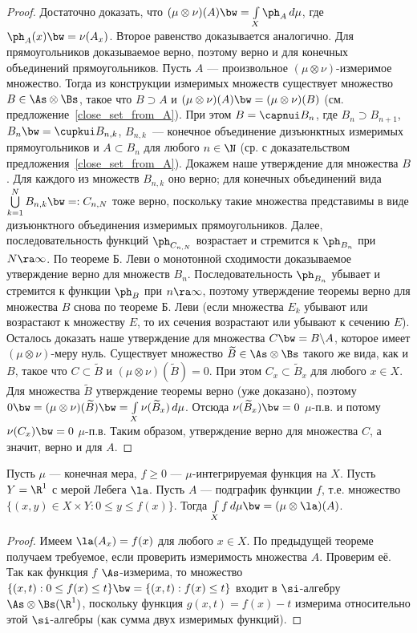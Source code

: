 \documentclass[10pt]{article}
\begin{document}
\begin{proof}
Достаточно доказать, что $(\mu\otimes\nu)(A)\bw
=\int\limits_X\ph_A\,d\mu$, где $\ph_A(x)\bw =\nu(A_x)$. Второе
равенство доказывается аналогично. Для прямоугольников доказываемое
верно, поэтому верно и для конечных объединений прямоугольников.
Пусть $A$ --- произвольное $(\mu\otimes\nu)$-измеримое множество.
Тогда из конструкции измеримых множеств существует множество
$B\in\As\otimes\Bs$, такое что $B\supset A$ и $(\mu\otimes\nu)(A)\bw
=(\mu\otimes\nu)(B)$ (см. предложение~\ref{close_set_from_A}). При
этом $B=\capnui B_n$, где $B_n\supset B_{n+1}$, $B_n\bw =\cupkui
B_{n,k}$, $B_{n,k}$~--- конечное объединение дизъюнктных измеримых
прямоугольников и $A\subset B_n$ для любого $n\in\N$ (ср. с
доказательством предложения~\ref{close_set_from_A}). Докажем наше
утверждение для множества $B$. Для каждого из множеств $B_{n,k}$ оно
верно; для конечных объединений вида
$\bigcup\limits_{k=1}^NB_{n,k}\bw =:C_{n,N}$ тоже верно, поскольку
такие множества представимы в виде дизъюнктного объединения
измеримых прямоугольников. Далее, последовательность функций
$\ph_{C_{n,N}}$ возрастает и стремится к $\ph_{B_n}$ при
$N\ra\infty$. По теореме Б. Леви о монотонной сходимости
доказываемое утверждение верно для множеств $B_n$.
Последовательность $\ph_{B_n}$ убывает и стремится к функции $\ph_B$
при $n\ra\infty$, поэтому утверждение теоремы верно для множества
$B$ снова по теореме Б. Леви (если множества $E_k$ убывают или
возрастают к множеству $E$, то их сечения возрастают или убывают к
сечению $E$). Осталось доказать наше утверждение для множества $C\bw
= B\backslash A$, которое имеет $(\mu\otimes\nu)$-меру нуль.
Существует множество $\widetilde B\in \As\otimes\Bs$ такого же вида,
как и $B$, такое что $C\subset \widetilde B$ и
$(\mu\otimes\nu)(\widetilde B)=0$. При этом $C_x\subset \widetilde
B_x$ для любого $x\in X$. Для множества $\widetilde B$ утверждение
теоремы верно (уже доказано), поэтому $0\bw
=(\mu\otimes\nu)(\widetilde B)\bw =\int\limits_X\nu(\widetilde
B_x)\,d\mu$. Отсюда $\nu(\widetilde B_x)\bw =0$ $\mu$-п.в. и потому
$\nu(C_x)\bw =0$ $\mu$-п.в. Таким образом, утверждение верно для
множества $C$, а значит, верно и для $A$.
\end{proof}
\begin{imp}\label{subgraphic}
Пусть $\mu$ --- конечная мера, $f\ge 0$ --- $\mu$-интегрируемая
функция на $X$. Пусть $Y=\R^1$ с мерой Лебега $\la$. Пусть $A$ ---
подграфик функции $f$, т.е. множество $\{(x,y)\in X\times Y:0\le
y\le f(x)\}$. Тогда $\int\limits_Xf\,d\mu\bw =(\mu\otimes\la)(A)$.
\end{imp}
\begin{proof}
Имеем $\la(A_x)=f(x)$ для любого $x\in X$. По предыдущей теореме
получаем требуемое, если проверить измеримость множества $A$.
Проверим её. Так как функция $f$ $\As$-измерима, то множество
$\{(x,t):0\le f(x)\le t\}\bw =\{(x,t):f(x)\le t\}$ входит в
$\si$-алгебру $\As\otimes\Bs(\R^1)$, поскольку функция
$g(x,t)=f(x)-t$ измерима относительно этой $\si$-алгебры (как сумма
двух измеримых функций).
\end{proof}
\end{document}
